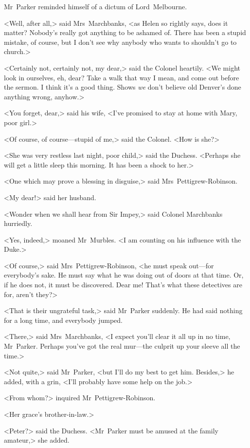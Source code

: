 Mr~Parker reminded himself of a dictum of Lord~Melbourne.

<Well, after all,> said Mrs~Marchbanks, <as Helen so rightly says, does it matter? Nobody's really got anything to be ashamed of. There has been a stupid mistake, of course, but I don't see why anybody who wants to shouldn't go to church.>

<Certainly not, certainly not, my dear,> said the Colonel heartily. <We might look in ourselves, eh, dear? Take a walk that way I mean, and come out before the sermon. I think it's a good thing. Shows \emph{we} don't believe old Denver's done anything wrong, anyhow.>

<You forget, dear,> said his wife, <I've promised to stay at home with Mary, poor girl.>

<Of course, of course—stupid of me,> said the Colonel. <How is she?>

<She was very restless last night, poor child,> said the Duchess.  <Perhaps she will get a little sleep this morning. It has been a shock to her.>

<One which may prove a blessing in disguise,> said Mrs~Pettigrew-Robinson.

<My dear!> said her husband.

<Wonder when we shall hear from Sir Impey,> said Colonel Marchbanks hurriedly.

<Yes, indeed,> moaned Mr~Murbles. <I am counting on his influence with the Duke.>

<Of course,> said Mrs~Pettigrew-Robinson, <he must speak out—for everybody's sake. He must say what he was doing out of doors at that time. Or, if he does not, it must be discovered. Dear me! That's what these detectives are for, aren't they?>

<That is their ungrateful task,> said Mr~Parker suddenly. He had said nothing for a long time, and everybody jumped.

<There,> said Mrs~Marchbanks, <I expect you'll clear it all up in no time, Mr~Parker. Perhaps you've got the real mur—the culprit up your sleeve all the time.>

<Not quite,> said Mr~Parker, <but I'll do my best to get him.  Besides,> he added, with a grin, <I'll probably have some help on the job.>

<From whom?> inquired Mr~Pettigrew-Robinson.

<Her grace's brother-in-law.>

<Peter?> said the Duchess. <Mr~Parker must be amused at the family amateur,> she added.

